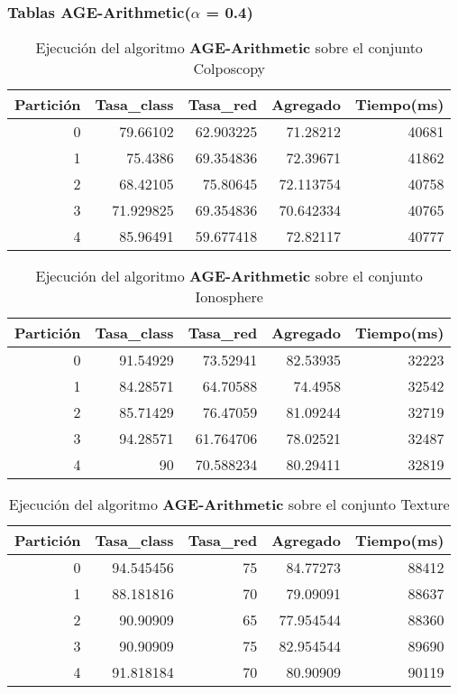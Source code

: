\documentclass[size=a4, parskip=half, titlepage=false, toc=flat, toc=bib, 12pt]{scrartcl}
\begin{document}
\newpage

\subsubsection{Tablas AGE-Arithmetic($\alpha$ = 0.4)}

 \begin{table}[ht]
  \centering
  \begin{tabular}[t]{rrrrr}
  \toprule
  Partición &Tasa\_class &Tasa\_red & Agregado & Tiempo(ms)\\
  \midrule
0         & 79.66102  & 62.903225 & 71.28212  & 40681  \\
1         & 75.4386   & 69.354836 & 72.39671  & 41862  \\
2         & 68.42105  & 75.80645  & 72.113754 & 40758  \\
3         & 71.929825 & 69.354836 & 70.642334 & 40765  \\
4         & 85.96491  & 59.677418 & 72.82117  & 40777  \\
  \bottomrule
  \end{tabular}
  \caption{Ejecución del algoritmo \textbf{AGE-Arithmetic} sobre el conjunto Colposcopy }
  \end{table}%

 \begin{table}[ht]
  \centering
  \begin{tabular}[t]{rrrrr}
  \toprule
  Partición &Tasa\_class &Tasa\_red & Agregado & Tiempo(ms)\\
  \midrule
0         & 91.54929  & 73.52941  & 82.53935 & 32223  \\
1         & 84.28571  & 64.70588  & 74.4958  & 32542  \\
2         & 85.71429  & 76.47059  & 81.09244 & 32719  \\
3         & 94.28571  & 61.764706 & 78.02521 & 32487  \\
4         & 90        & 70.588234 & 80.29411 & 32819  \\
  \bottomrule
  \end{tabular}
  \caption{Ejecución del algoritmo \textbf{AGE-Arithmetic} sobre el conjunto Ionosphere}
  \end{table}%

 \begin{table}[ht]
  \centering
  \begin{tabular}[t]{rrrrr}
  \toprule
  Partición &Tasa\_class &Tasa\_red & Agregado & Tiempo(ms)\\
  \midrule
0         & 94.545456 & 75       & 84.77273  & 88412  \\
1         & 88.181816 & 70       & 79.09091  & 88637  \\
2         & 90.90909  & 65       & 77.954544 & 88360  \\
3         & 90.90909  & 75       & 82.954544 & 89690  \\
4         & 91.818184 & 70       & 80.90909  & 90119  \\
\bottomrule
  \end{tabular}
  \caption{Ejecución del algoritmo \textbf{AGE-Arithmetic} sobre el conjunto Texture}
  \end{table}%
\end{document}
